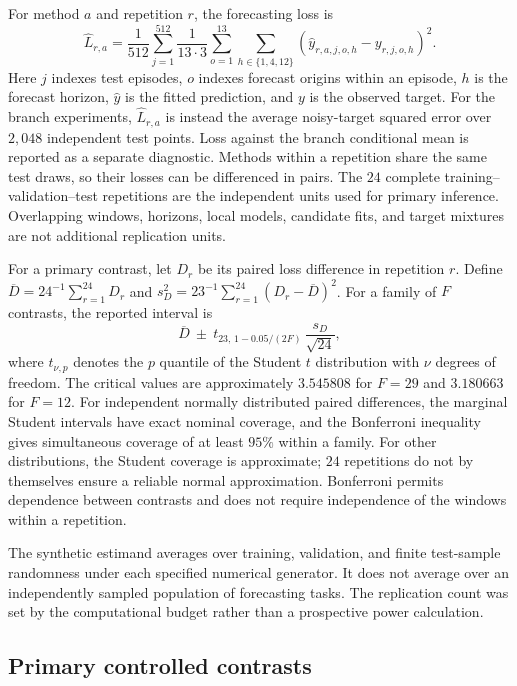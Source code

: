 For method $a$ and repetition $r$, the forecasting loss is
\[
 \widehat L_{r,a}=\frac1{512}\sum_{j=1}^{512}
 \frac1{13\cdot3}\sum_{o=1}^{13}\sum_{h\in\{1,4,12\}}
 (\widehat y_{r,a,j,o,h}-y_{r,j,o,h})^2.
\]
Here $j$ indexes test episodes, $o$ indexes forecast origins within an
episode, $h$ is the forecast horizon, $\widehat y$ is the fitted prediction,
and $y$ is the observed target. For the branch experiments,
$\widehat L_{r,a}$ is instead the average noisy-target squared error over
$2{,}048$ independent test points. Loss against the branch conditional
mean is reported as a separate diagnostic. Methods within a repetition
share the same test draws, so their losses can be differenced in pairs.
The $24$ complete training--validation--test repetitions are the independent
units used for primary inference. Overlapping windows, horizons, local
models, candidate fits, and target mixtures are not additional replication
units.

For a primary contrast, let $D_r$ be its paired loss difference in
repetition $r$. Define
$\overline D=24^{-1}\sum_{r=1}^{24}D_r$ and
$s_D^2=23^{-1}\sum_{r=1}^{24}(D_r-\overline D)^2$.
For a family of $F$ contrasts, the reported interval is
\[
 \overline D\ \mathbin{\pm}\
 t_{23,\,1-0.05/(2F)}\,\frac{s_D}{\sqrt{24}},
\]
where $t_{\nu,p}$ denotes the $p$ quantile of the Student $t$
distribution with $\nu$ degrees of freedom. The critical values are
approximately $3.545808$ for $F=29$ and $3.180663$ for $F=12$.
For independent normally distributed paired differences, the marginal
Student intervals have exact nominal coverage, and the Bonferroni
inequality gives simultaneous coverage of at least $95\%$ within a
family. For other distributions, the Student coverage is approximate;
$24$ repetitions do not by themselves ensure a reliable normal
approximation. Bonferroni permits dependence between contrasts and
does not require independence of the windows within a repetition.

The synthetic estimand averages over training, validation, and finite
test-sample randomness under each specified numerical generator.
It does not average over an independently sampled population of
forecasting tasks. The replication count was set by the computational
budget rather than a prospective power calculation.

\subsection{Primary controlled contrasts}

